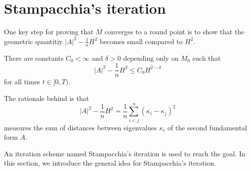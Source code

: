 \section{Stampacchia's iteration}
One key step for proving that $M$ converges to a round point is to show that the geometric quantitiy $\left| A \right| ^2-\frac{1}{n}H^2$ becomes small compared to $H^2$.

\begin{theorem} \label{PinEs}
	There are constants $C_0<\infty $ and $\delta >0$ depending only on $M_0$ such that 
	\[\left| A \right| ^2-\frac{1}{n}H^2 \leq C_0 H^{2-\delta }\]
	for all times $t \in [0,T)$. 
\end{theorem}

The rationale behind is that
\[\left| A \right| ^2-\frac{1}{n}H^2=\frac{1}{n}\sum_{i<j}^{n}(\kappa _i-\kappa _j)^2\]
measures the sum of distances between eigenvalues $\kappa _i$ of the second fundamental form $A$. 

An iteration scheme named Stampacchia's iteration is used to reach the goal. In this section, we introduce the general idea for Stampacchia's iteration.

